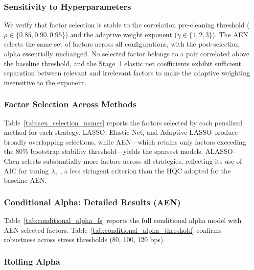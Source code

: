 \subsubsection{Sensitivity to Hyperparameters}
\label{app:aen_sensitivity}

We verify that factor selection is stable to the correlation pre-cleaning
threshold ($\rho \in \{0.85, 0.90, 0.95\}$) and the adaptive weight
exponent ($\gamma \in \{1, 2, 3\}$). The AEN selects the same set of
factors across all configurations, with the post-selection alpha
essentially unchanged. No selected factor belongs to a pair correlated
above the baseline threshold, and the Stage~1 elastic net coefficients
exhibit sufficient separation between relevant and irrelevant factors
to make the adaptive weighting insensitive to the exponent.

\subsubsection{Factor Selection Across Methods}
\label{app:aen_selection_matrix}

Table~\ref{tab:aen_selection_names} reports the factors selected by each penalised method for each strategy.
LASSO, Elastic Net, and Adaptive LASSO produce broadly overlapping selections, while AEN---which retains only factors exceeding the 80\% bootstrap stability threshold---yields the sparsest models.
ALASSO-Chen selects substantially more factors across all strategies,
reflecting its use of AIC for tuning $\lambda_1$ \citep{chen2025anomalies},
a less stringent criterion than the HQC adopted for the baseline AEN.




\subsubsection{Conditional Alpha: Detailed Results (AEN)}
\label{app:aen_conditional}

Table~\ref{tab:conditional_alpha_fs} reports the full
\citet{christopherson1998conditioning} conditional alpha model with AEN-selected factors.
Table~\ref{tab:conditional_alpha_threshold} confirms robustness across
stress thresholds (80, 100, 120 bps).






\subsubsection{Rolling Alpha}
\label{app:aen_rolling}

